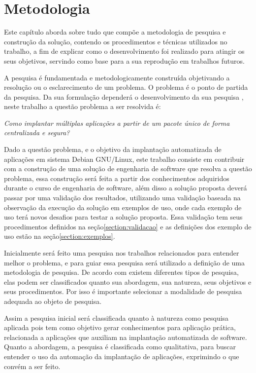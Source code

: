 \chapter{Metodologia}
\label{cap-metodologia}
Este capítulo aborda sobre tudo que compõe a metodologia de pesquisa e construção
da solução, contendo os procedimentos e técnicas utilizados no trabalho, a fim de
explicar como o desenvolvimento foi realizado para atingir os seus objetivos,
servindo como base para a sua reprodução em trabalhos futuros.

A pesquisa é fundamentada e metodologicamente construída objetivando a resolução
ou o esclarecimento de um problema. O problema é o ponto de partida da pesquisa.
Da sua formulação dependerá o desenvolvimento da sua pesquisa
\cite{moresi2003metodologia}, neste trabalho a questão problema a ser resolvida é:

\begin{center}
  \textit{
  Como implantar múltiplas aplicações a partir de um pacote único
  de forma centralizada e segura?
}
\end{center}

Dado a questão problema, e o objetivo da implantação automatizada
de aplicações em sistema Debian GNU/Linux, este trabalho consiste em contribuir
com a construção de uma solução de engenharia de software que resolva a questão
problema, essa construção será feita a partir dos conhecimentos adquiridos durante
o curso de engenharia de software, além disso a solução proposta deverá passar
por uma validação dos resultados, utilizando uma validação baseada na observação
da execução da solução em exemplos de uso, onde cada exemplo de uso terá novos
desafios para testar a solução proposta. Essa validação tem seus procedimentos
definidos na seção\ref{section:validacao} e as definições dos exemplo de uso
estão na seção\ref{section:exemplos}.

Inicialmente será feito uma pesquisa nos trabalhos relacionados para entender
melhor o problema, e para guiar essa pesquisa será utilizado a definição de uma
metodologia de pesquisa. De acordo com\cite{gerhardt2009metodos} existem diferentes
tipos de pesquisa, elas podem ser classificados quanto sua abordagem, sua natureza,
seus objetivos e seus procedimentos. Por isso é importante selecionar a modalidade
de pesquisa adequada ao objeto de pesquisa.

Assim a pesquisa inicial será classificada quanto à natureza como pesquisa aplicada
pois tem como objetivo gerar conhecimentos para aplicação prática\cite{gerhardt2009metodos},
relacionada a aplicações que auxiliam na implantação automatizada de software.
Quanto a abordagem, a pesquisa é classificada como qualitativa, para buscar entender
o uso da automação da implantação de aplicações, exprimindo o que convém
a ser feito.

